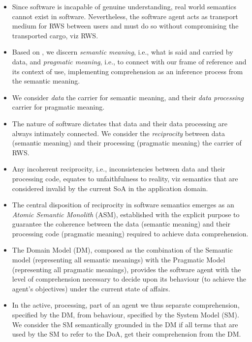 \documentclass[sort&compress,preprint,authoryear,3p,twocolumn]{elsarticle}
\providecommand{\tightlist}{%
  \setlength{\itemsep}{0pt}\setlength{\parskip}{0pt}}
\begin{document}
\begin{itemize}
\tightlist
\item
  Since software is incapable of genuine understanding, real world
  semantics cannot exist in software. Nevertheless, the software agent
  acts as transport medium for RWS between users and must do so without
  compromising the transported cargo, viz RWS.
\item
  Based on \citep{Grice:1991BT}, we discern \emph{semantic meaning},
  i.e., what is said and carried by data, and \emph{pragmatic meaning},
  i.e., to connect with our frame of reference and its context of use,
  implementing comprehension as an inference process from the semantic
  meaning.
\item
  We consider \emph{data} the carrier for semantic meaning, and their
  \emph{data processing} carrier for pragmatic meaning.
\item
  The nature of software dictates that data and their data processing
  are always intimately connected. We consider the \emph{reciprocity}
  between data (semantic meaning) and their processing (pragmatic
  meaning) the carrier of RWS.
\item
  Any incoherent reciprocity, i.e., inconsistencies between data and
  their processing code, equates to unfaithfulness to reality, viz
  semantics that are considered invalid by the current SoA in the
  application domain.
\item
  The central disposition of reciprocity in software semantics emerges
  as an \emph{Atomic Semantic Monolith} (ASM), established with the
  explicit purpose to guarantee the coherence between the data (semantic
  meaning) and their processing code (pragmatic meaning) required to
  achieve data comprehension.
\item
  The Domain Model (DM), composed as the combination of the Semantic
  model (representing all semantic meanings) with the Pragmatic Model
  (representing all pragmatic meanings), provides the software agent
  with the level of comprehension necessary to decide upon its behaviour
  (to achieve the agent's objectives) under the current state of
  affairs.
\item
  In the active, processing, part of an agent we thus separate
  comprehension, specified by the DM, from behaviour, specified by the
  System Model (SM). We consider the SM semantically grounded in the DM
  if all terms that are used by the SM to refer to the DoA, get their
  comprehension from the DM.
\end{itemize}
\end{document}
